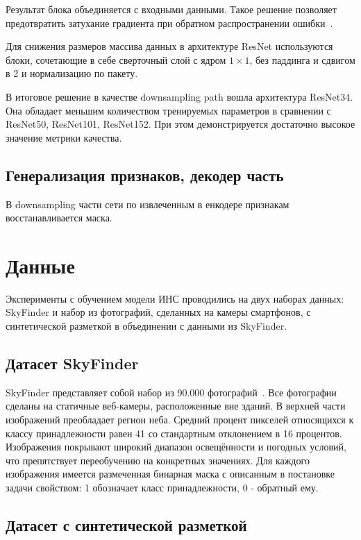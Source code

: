 Результат блока объединяется с входными данными.
Такое решение позволяет предотвратить затухание градиента при обратном распространении ошибки~\autocite{he2015deep}.

Для снижения размеров массива данных в архитектуре ResNet используются блоки, сочетающие в себе сверточный слой
с ядром $1 \times 1$, без паддинга и сдвигом в 2 и нормализацию по пакету.

В итоговое решение в качестве downsampling path вошла архитектура ResNet34.
Она обладает меньшим количеством тренируемых параметров в сравнении с ResNet50, ResNet101, ResNet152.
При этом демонстрируется достаточно высокое значение метрики качества.

\subsection{Генерализация признаков, декодер часть}

В downsampling части сети по извлеченным в енкодере признакам восстанавливается маска.

\section{Данные}

Эксперименты с обучением модели ИНС проводились на двух наборах данных: SkyFinder и набор из фотографий, сделанных на камеры смартфонов,
с синтетической разметкой в объединении с данными из SkyFinder.

\subsection{Датасет SkyFinder}

SkyFinder представляет собой набор из 90.000 фотографий~\autocite{mihail2016sky}.
Все фотографии сделаны на статичные веб-камеры, расположенные вне зданий.
В верхней части изображений преобладает регион неба.
Средний процент пикселей относящихся к классу принадлежности равен 41 со стандартным отклонением в 16 процентов.
Изображения покрывают широкий диапазон освещённости и погодных условий, что препятствует переобучению на конкретных значениях.
Для каждого изображения имеется размеченная бинарная маска с описанным в постановке задачи свойством: 1 обозначает класс принадлежности, 0 - обратный ему.

\subsection{Датасет с синтетической разметкой}

\Conc

\printbibliography[%
    heading=bibintoc%
]


